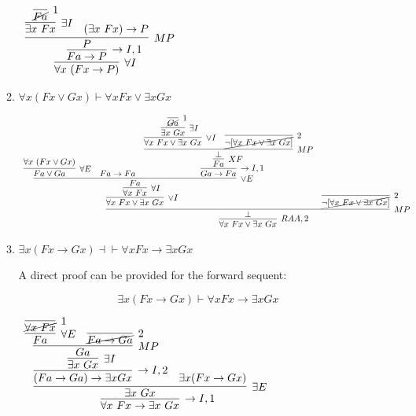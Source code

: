 \documentclass[11pt]{report}
\begin{document}
\begin{enumerate}
\begin{enumerate}
					\begin{mdframed}
						\begin{center}
							$\begin{array}{c}
								\infer[\forall I]{\forall x \ (Fx \to P)}
									{\infer[\to I,1]{Fa \to P}
										{\infer[MP]{P}
											{\infer[\exists I]{\exists x \ Fx}
												{\infer[1]{\cancel{Fa}}{}}
											&
											(\exists x \ Fx) \to P}}}
							\end{array}$
						\end{center}
					\end{mdframed}

			\item $\forall x (Fx \lor Gx) \vdash  \forall x Fx \lor \exists x Gx$
			
						\begin{center}
							\tiny{$\begin{array}{c}
								\infer[RAA,2]{\forall x \ Fx \lor \exists x \ Gx}
									{\infer[MP]{\bot}
										{\infer[\lor I]{\forall x \ Fx \lor \exists x \ Gx}
											{\infer[\forall I]{\forall x \ Fx}
												{\infer[\lor E]{Fa}
													{\infer[\forall E]{Fa \lor Ga}{\forall x \ (Fx \lor Gx)}
													&
													Fa \to Fa
													&
													\infer[\to I,1]{Ga \to Fa}
														{\infer[XF]{Fa}
															{\infer[MP]{\bot}
																{\infer[\lor I]{\forall x \ Fx \lor \exists x \ Gx}
																	{\infer[\exists I]{\exists x \ Gx}
																		{\infer[1]{\cancel{Ga}}{}}}
																&
																\infer[2]{\cancel{\lnot[\forall x \ Fx \lor \exists x \ Gx]}}{}}}}}}}
										&
										\infer[2]{\cancel{\lnot[\forall x \ Fx \lor \exists x \ Gx]}}{}}}
							\end{array}$}
						\end{center}
			
			\newpage
			\item $\exists x (Fx \to Gx) \dashv \vdash  \forall x Fx \to \exists x Gx$
			
			A direct proof can be provided for the forward sequent:

			$$\exists x (Fx \to Gx) \vdash \forall x Fx \to \exists x Gx$$
			
				\begin{mdframed}
					\begin{center}
						$\begin{array}{c}
							\infer[\to I,1]{\forall x \ Fx \to \exists x \ Gx}
								{\infer[\exists E]{\exists x \ Gx}
									{\infer[\to I,2]{(Fa \to Ga) \to \exists x Gx}
										{\infer[\exists I]{\exists x \ Gx}
											{\infer[MP]{Ga}
												{\infer[\forall E]{Fa}
													{\infer[1]{\cancel{\forall x \ Fx}}{}}
												&
												\infer[2]{\cancel{Fa \to Ga}}{}}}}
									&
									\exists x (Fx \to Gx)}}
						\end{array}$
					\end{center}
				\end{mdframed}


\end{enumerate}
\end{enumerate}
\end{document}
